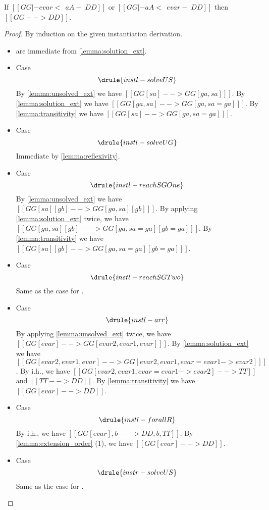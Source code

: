 \begin{lemma}   \label{lemma:inst_extension}
 If $[[  GG |- evar <~~ aA  -| DD   ]]$ or $[[ GG |- aA <~~ evar -| DD  ]]$ then $[[ GG --> DD ]]$.
\end{lemma}
\begin{proof}
  By induction on the given instantiation derivation.
  \begin{itemize}
  \item {}
    are immediate from \cref{lemma:solution_ext}.

  \item Case \[ \drule{instl-solveUS} \]
    By \cref{lemma:unsolved_ext} we have $[[ GG[sa] --> GG[ga, sa]  ]]$. By \cref{lemma:solution_ext} we have
    $[[ GG[ga, sa] --> GG[ga, sa = ga]  ]]$. By \cref{lemma:transitivity} we have $[[ GG[sa] --> GG[ga, sa=ga]   ]]$.

  \item Case \[ \drule{instl-solveUG} \] Immediate by \cref{lemma:reflexivity}.


  \item Case \[  \drule{instl-reachSGOne}  \]
    By \cref{lemma:unsolved_ext} we have $[[  GG[sa][gb] --> GG[ga,sa][gb]  ]]$. By applying \cref{lemma:solution_ext} twice,
    we have $[[ GG[ga,sa][gb] --> GG[ga,sa=ga][gb=ga]    ]]$. By \cref{lemma:transitivity} we have $[[ GG[sa][gb] --> GG[ga,sa=ga][gb=ga]  ]]$.

  \item Case \[  \drule{instl-reachSGTwo}   \] Same as the case for .

  \item Case \[ \drule{instl-arr}\]
    By applying \cref{lemma:unsolved_ext} twice, we have $[[  GG[evar] --> GG[evar2, evar1, evar]  ]]$.
    By \cref{lemma:solution_ext} we have $[[ GG[evar2, evar1, evar] --> GG[evar2, evar1, evar = evar1 -> evar2]  ]]$.
    By i.h., we have $[[ GG[evar2, evar1, evar = evar1 -> evar2] --> TT  ]]$ and $[[ TT --> DD  ]]$. By \cref{lemma:transitivity} we
    have $[[  GG[evar] --> DD  ]]$.

  \item Case \[ \drule{instl-forallR}  \]
    By i.h., we have $[[ GG[evar], b --> DD , b , TT  ]]$. By \cref{lemma:extension_order} (1), we have $[[GG[evar] --> DD]]$.

  \item Case \[ \drule{instr-solveUS}  \] Same as the case for .


\end{itemize}
\end{proof}
